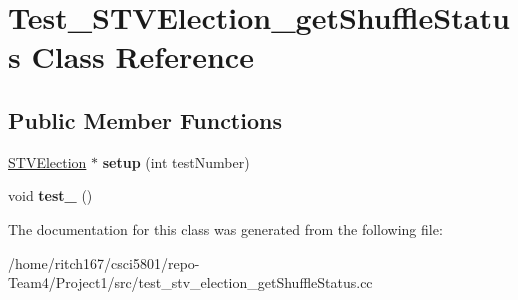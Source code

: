 \hypertarget{classTest__STVElection__getShuffleStatus}{}\section{Test\+\_\+\+S\+T\+V\+Election\+\_\+get\+Shuffle\+Status Class Reference}
\label{classTest__STVElection__getShuffleStatus}
\subsection*{Public Member Functions}
\begin{DoxyCompactItemize}
\item 
\mbox{\label{classTest__STVElection__getShuffleStatus_afb20f4a372286058b2471cc09b058f08}} 
\hyperlink{classSTVElection}{S\+T\+V\+Election} $\ast$ {\bfseries setup} (int test\+Number)
\item 
\mbox{\label{classTest__STVElection__getShuffleStatus_a9af8dd6907112e82259dd424df0a08a6}} 
void {\bfseries test\+\_} ()
\end{DoxyCompactItemize}


The documentation for this class was generated from the following file\+:\begin{DoxyCompactItemize}
\item 
/home/ritch167/csci5801/repo-\/\+Team4/\+Project1/src/test\+\_\+stv\+\_\+election\+\_\+get\+Shuffle\+Status.\+cc\end{DoxyCompactItemize}
